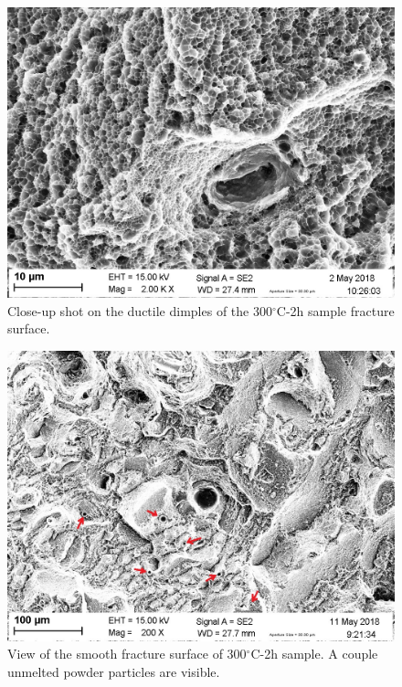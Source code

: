 \begin{figure}[ht]
	\centering
	\centerline{\includegraphics[scale=0.40]{Images/frac-04_08.jpg}}
	\decoRule
	\caption[Close-up shot on the ductile dimples of the 300$^\circ$C-2h sample fracture surface]{Close-up shot on the ductile dimples of the 300$^\circ$C-2h sample fracture surface.}
	\label{fig:frac_04_08}
\end{figure}

\begin{figure}[ht]
	\centering
	\centerline{\includegraphics[scale=0.40]{Images/frac-10_26.jpg}}
	\decoRule
	\caption[View of the smooth fracture surface of 300$^\circ$C-2h sample. A couple unmelted powder particles are visible]{View of the smooth fracture surface of 300$^\circ$C-2h sample. A couple unmelted powder particles are visible.}
	\label{fig:frac_10_26}
\end{figure}

